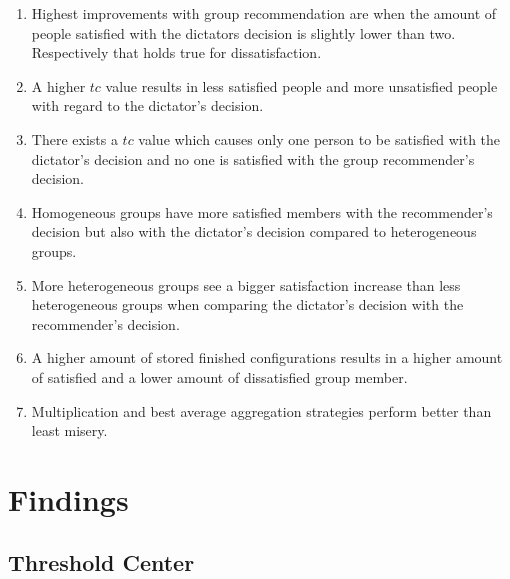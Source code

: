\begin{enumerate}[font={\bfseries},label={H\arabic*}]
    \item Highest improvements with group recommendation are when the amount of people satisfied with the dictators decision is slightly lower than two. Respectively that holds true for dissatisfaction. 
    \item A higher $tc$ value results in less satisfied people and more unsatisfied people with regard to the dictator's decision.
    \item There exists a $tc$ value which causes only one person to be satisfied with the dictator's decision and no one is satisfied with the group recommender's decision.
    \item Homogeneous groups have more satisfied members with the recommender's decision but also with the dictator's decision compared to heterogeneous groups.
    \item More heterogeneous groups see a bigger satisfaction increase than less heterogeneous groups when comparing the dictator's decision with the recommender's decision.
    \item A higher amount of stored finished configurations results in a higher amount of satisfied and a lower amount of dissatisfied group member.
    \item Multiplication and best average aggregation strategies perform better than least misery. %
\end{enumerate}


\section{Findings}
\label{sec:Evaluation:Findings}

\subsection{Threshold Center}

